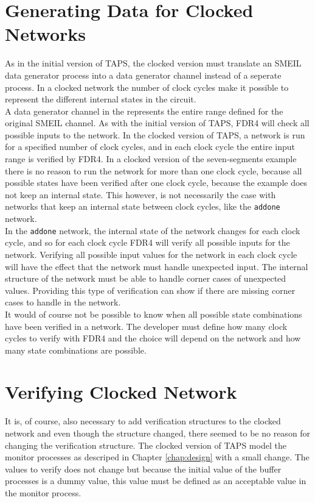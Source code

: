 \section{Generating Data for Clocked Networks}
As in the initial version of TAPS, the clocked version must translate an SMEIL data generator process into a \cspm{} data generator channel instead of a seperate process. In a clocked network the number of clock cycles make it possible to represent the different internal states in the circuit.\\

A data generator channel in \cspm{} the represents the entire range defined for the original SMEIL channel. As with the initial version of TAPS, FDR4 will check all possible inputs to the network.
In the clocked version of TAPS, a network is run for a specified number of clock cycles, and in each clock cycle the entire input range is verified by FDR4.
In a clocked version of the seven-segments example there is no reason to run the network for more than one clock cycle, because all possible states have been verified after one clock cycle, because the example does not keep an internal state. This however, is not necessarily the case with networks that keep an internal state between clock cycles, like the \texttt{addone} network.\\

In the \texttt{addone} network, the internal state of the network changes for each clock cycle, and so for each clock cycle FDR4 will verify all possible inputs for the network. Verifying all possible input values for the network in each clock cycle will have the effect that the network must handle unexpected input. The internal structure of the network must be able to handle corner cases of unexpected values. Providing this type of verification can show if there are missing corner cases to handle in the network.\\

It would of course not be possible to know when all possible state combinations have been verified in a network. The developer must define how many clock cycles to verify with FDR4 and the choice will depend on the network and how many state combinations are possible.
\section{Verifying Clocked Network}
It is, of course, also necessary to add verification structures to the clocked \cspm{} network and even though the structure changed, there seemed to be no reason for changing the verification structure. The clocked version of TAPS model the monitor processes as descriped in Chapter \ref{chap:design} with a small change. The values to verify does not change but because the initial value of the buffer processes is a dummy value, this value must be defined as an acceptable value in the monitor process. \\

